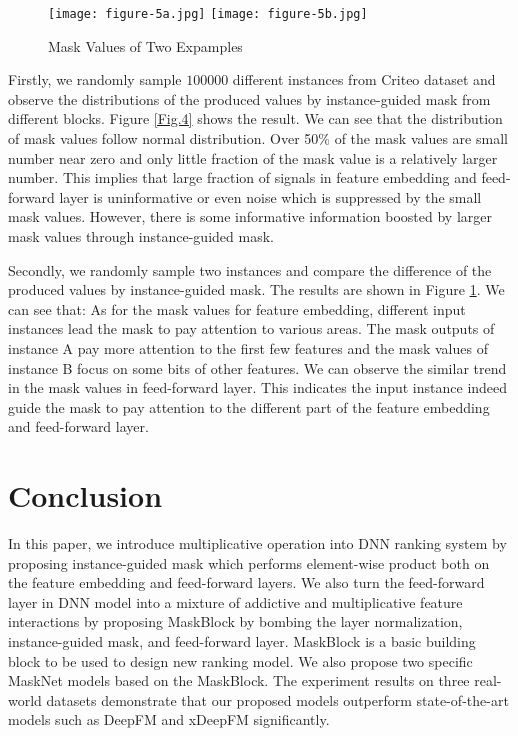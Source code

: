 \documentclass[sigconf]{acmart}
\begin{document}
\begin{figure}
  \setlength{\abovecaptionskip}{1pt}
  \texttt{[image: figure-5a.jpg]}\hfill
  \texttt{[image: figure-5b.jpg]}
  \caption{Mask Values of Two Expamples}
  \label{Fig.5}
\end{figure}


Firstly, we randomly sample $100000$ different instances from Criteo dataset and observe the distributions of the produced values by instance-guided mask from different blocks. Figure \ref{Fig.4} shows the result. We can see that the distribution of mask values follow normal distribution. Over 50\% of the mask values are small number near zero and only little fraction of the mask value is a relatively larger number. This implies that large fraction of  signals in feature embedding and feed-forward layer is uninformative or even noise which is suppressed by the small mask values. However, there is some informative information boosted by larger mask values through instance-guided mask.


Secondly, we randomly sample two instances and compare the difference of the produced values  by instance-guided mask. The results are shown in Figure \ref{Fig.5}. We can see that: As for the mask values for feature embedding, different input instances lead the mask to pay attention to various areas. The mask outputs of instance A pay more attention to the first few features and the mask values of instance B focus on some bits of other features. We can observe the similar trend in the mask values in feed-forward layer. This indicates the input instance indeed guide the mask to pay attention to the different part of the feature embedding and feed-forward layer.



\section{Conclusion}
In this paper, we introduce multiplicative operation into DNN ranking system by proposing  instance-guided mask which performs element-wise product both on the feature embedding and feed-forward layers. We also turn the feed-forward layer in DNN model into a mixture of addictive and multiplicative feature interactions by proposing MaskBlock by bombing the layer normalization, instance-guided mask, and feed-forward layer. MaskBlock is a basic building block to be used to design new ranking model. We also propose two specific MaskNet models based on the MaskBlock. The experiment results on three real-world datasets demonstrate that our proposed models outperform state-of-the-art models such as DeepFM and xDeepFM significantly.




\end{document}

